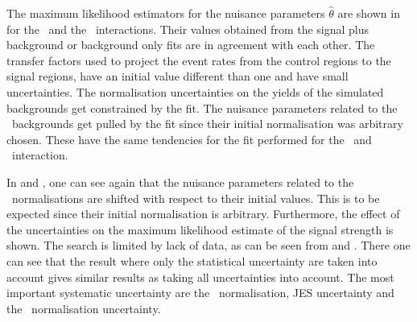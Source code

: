 The maximum likelihood estimators for the nuisance parameters $\hat{\theta}$ are shown in  for the \Zct\ and the \Zut\ interactions. Their values obtained from the signal plus background or background only fits are in agreement with each other. The transfer factors used to project the event rates from the control regions to the signal regions, have an initial value different than one and have small uncertainties. The normalisation uncertainties on the yields of the simulated backgrounds get constrained by the fit. The nuisance parameters related to the \NPL\ backgrounds get pulled by the fit since their initial normalisation was arbitrary chosen. These have the same tendencies for the fit performed for the \Zut\ and \Zct\ interaction.  %

 In  and , one can see again that the nuisance parameters related to the \NPL\ normalisations are shifted with respect to their initial values. This is to be expected since their initial  normalisation is arbitrary. Furthermore, the effect of the uncertainties on the maximum likelihood estimate of the signal strength is shown. The search is limited by lack of data, as can be seen from  and . There one can see that the result where only the statistical uncertainty are taken into account gives similar results as taking all uncertainties into account.  The most important systematic uncertainty are the \ttZ\ normalisation, JES uncertainty and the \NPL\ normalisation uncertainty. 
 
